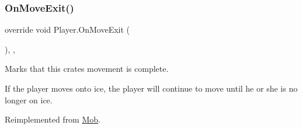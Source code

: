 \subsubsection{\texorpdfstring{On\+Move\+Exit()}{OnMoveExit()}}
{\footnotesize\ttfamily override void Player.\+On\+Move\+Exit (\begin{DoxyParamCaption}{ }\end{DoxyParamCaption})\hspace{0.3cm}{\ttfamily [inline]}, {\ttfamily [protected]}, {\ttfamily [virtual]}}



Marks that this crate\textquotesingle{}s movement is complete. 

If the player moves onto ice, the player will continue to move until he or she is no longer on ice. 

Reimplemented from \mbox{\hyperlink{class_mob_aa523ff737b0324ec092670280d528c58}{Mob}}.

